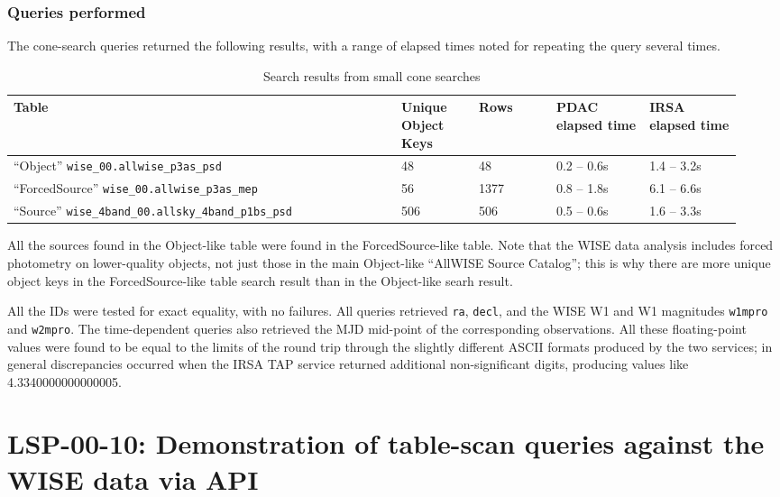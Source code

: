 \documentclass[DM,lsstdraft,STR,toc]{lsstdoc}
\begin{document}
\subsubsection{Queries performed}

The cone-search queries returned the following results, with a range of elapsed times noted for repeating the query several times.

\begin{table}[h]
\centering
\begin{tabular}{p{0.5 \linewidth} p{0.1 \linewidth} p{0.1 \linewidth} p{0.12 \linewidth} p{0.12 \linewidth}}
Table & Unique Object Keys & Rows & PDAC elapsed time & IRSA elapsed time \\ \hline
``Object'' \verb|wise_00.allwise_p3as_psd| & 48 & 48 & 0.2 -- 0.6s & 1.4 -- 3.2s \\
``ForcedSource'' \verb|wise_00.allwise_p3as_mep| & 56 & 1377 & 0.8 -- 1.8s & 6.1 -- 6.6s \\
``Source'' \verb|wise_4band_00.allsky_4band_p1bs_psd| & 506 & 506 & 0.5 -- 0.6s & 1.6 -- 3.3s \\
\end{tabular}
\caption{Search results from small cone searches}
\label{tab:conesyntax}
\end{table}

All the sources found in the Object-like table were found in the ForcedSource-like table.
Note that the WISE data analysis includes forced photometry on lower-quality objects,
not just those in the main Object-like ``AllWISE Source Catalog'';
this is why there are more unique object keys in the ForcedSource-like table search result than in the Object-like searh result.

All the IDs were tested for exact equality, with no failures.
All queries retrieved \verb|ra|, \verb|decl|, and the WISE W1 and W1 magnitudes \verb|w1mpro| and \verb|w2mpro|.
The time-dependent queries also retrieved the MJD mid-point of the corresponding observations.
All these floating-point values were found to be equal to the limits of the round trip through the slightly different ASCII formats produced by the two services;
in general discrepancies occurred when the IRSA TAP service returned additional non-significant digits,
producing values like 4.3340000000000005.

\section{LSP-00-10: Demonstration of table-scan queries against the WISE data via API}
\label{sect:lsp-00-10}
\end{document}
